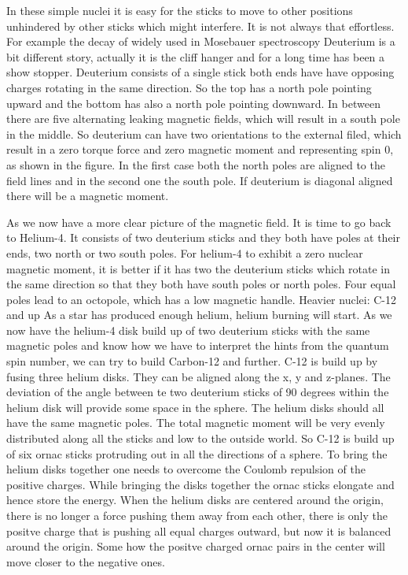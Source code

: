 In these simple nuclei it is easy for the sticks to move to other positions unhindered by other sticks which might interfere. It is not always that effortless. For example the decay of widely used in Mosebauer spectroscopy
Deuterium is a bit different story, actually it is the cliff hanger and for a long time has been a show stopper. Deuterium consists of a single stick both ends have have opposing charges rotating in the same direction. So the top has a north pole pointing upward and the bottom has also a north pole pointing downward. In between there are five alternating leaking magnetic fields, which will result in a south pole in the middle. So deuterium can have two orientations to the external filed, which result in a zero torque force and zero magnetic moment and representing spin 0, as shown in the figure. In the first case both the north poles are aligned to the field lines and in the second one the south pole. If deuterium is diagonal aligned there will be a magnetic moment.

As we now have a more clear picture of the magnetic field. It is time to go back to Helium-4. It consists of two deuterium sticks and they both have poles at their ends, two north or two south poles. For helium-4 to exhibit a zero nuclear magnetic moment, it is better if it has two the deuterium sticks which rotate in the same direction so that they both have south poles or north poles. Four equal poles lead to an octopole, which has a low magnetic handle.
Heavier nuclei: C-12 and up
As a star has produced enough helium, helium burning will start.
As we now have the helium-4 disk build up of two deuterium sticks with the same magnetic poles and know how we have to interpret the hints from the quantum spin number, we can try to build Carbon-12 and further. C-12 is build up by fusing three helium disks. They can be aligned along the x, y and z-planes. The deviation of the angle between te two deuterium sticks of 90 degrees within the helium disk will provide some space in the sphere. The helium disks should all have the same magnetic poles. The total magnetic moment will be very evenly distributed along all the sticks and low to the outside world. So C-12 is build up of six ornac sticks protruding out in all the directions of a sphere. To bring the helium disks together one needs to overcome the Coulomb repulsion of the positive charges. While bringing the disks together the ornac sticks elongate and hence store the energy. When the helium disks are centered around the origin, there is no longer a force pushing them away from each other, there is only the positve charge that is pushing all equal charges outward, but now it is balanced around the origin. Some how the positve charged ornac pairs in the center will move closer to the negative ones.

